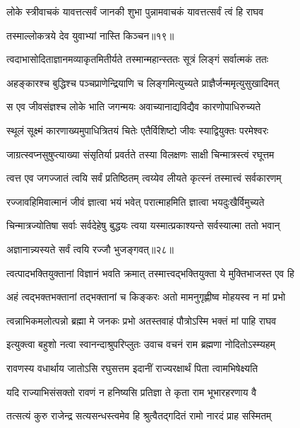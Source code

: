 \twolineshloka
{लोके स्त्रीवाचकं यावत्तत्सर्वं जानकी शुभा}
{पुन्नामवाचकं यावत्तत्सर्वं त्वं हि राघव} %

{तस्माल्लोकत्रये देव युवाभ्यां नास्ति किञ्चन॥१९॥} %


\twolineshloka
{त्वदाभासोदिताज्ञानमव्याकृतमितीर्यते}
{तस्मान्महान्स्ततः सूत्रं लिङ्गं सर्वात्मकं ततः} %

\twolineshloka
{अहङ्कारश्च बुद्धिश्च पञ्चप्राणेन्द्रियाणि च}
{लिङ्गमित्युच्यते प्राज्ञैर्जन्ममृत्युसुखादिमत्} %

\twolineshloka
{स एव जीवसंज्ञश्च लोके भाति जगन्मयः}
{अवाच्यानाद्यविद्यैव कारणोपाधिरुच्यते} %

\twolineshloka
{स्थूलं सूक्ष्मं कारणाख्यमुपाधित्रितयं चितेः}
{एतैर्विशिष्टो जीवः स्याद्वियुक्तः परमेश्वरः} %

\twolineshloka
{जाग्रत्स्वप्नसुषुप्त्याख्या संसृतिर्या प्रवर्तते}
{तस्या विलक्षणः साक्षी चिन्मात्रस्त्वं रघूत्तम} %

\twolineshloka
{त्वत्त एव जगज्जातं त्वयि सर्वं प्रतिष्ठितम्}
{त्वय्येव लीयते कृत्स्नं तस्मात्त्वं सर्वकारणम्} %

\twolineshloka
{रज्जावहिमिवात्मानं जीवं ज्ञात्वा भयं भवेत्}
{परात्माहमिति ज्ञात्वा भयदुःखैर्विमुच्यते} %

\twolineshloka
{चिन्मात्रज्योतिषा सर्वाः सर्वदेहेषु बुद्धयः}
{त्वया यस्मात्प्रकाश्यन्ते सर्वस्यात्मा ततो भवान्} %

{अज्ञानान्न्यस्यते सर्वं त्वयि रज्जौ भुजङ्गवत्॥२८॥} %


\twolineshloka
{त्वत्पादभक्तियुक्तानां विज्ञानं भवति क्रमात्}
{तस्मात्त्वद्भक्तियुक्ता ये मुक्तिभाजस्त एव हि} %

\twolineshloka
{अहं त्वद्भक्तभक्तानां तद्भक्तानां च किङ्करः}
{अतो मामनुगृह्णीष्व मोहयस्व न मां प्रभो} %

\twolineshloka
{त्वन्नाभिकमलोत्पन्नो ब्रह्मा मे जनकः प्रभो}
{अतस्तवाहं पौत्रोऽस्मि भक्तं मां पाहि राघव} %

\twolineshloka
{इत्युक्त्वा बहुशो नत्वा स्वानन्दाश्रुपरिप्लुतः}
{उवाच वचनं राम ब्रह्मणा नोदितोऽस्म्यहम्} %

\twolineshloka
{रावणस्य वधार्थाय जातोऽसि रघुसत्तम}
{इदानीं राज्यरक्षार्थं पिता त्वामभिषेक्ष्यति} %

\twolineshloka
{यदि राज्याभिसंसक्तो रावणं न हनिष्यसि}
{प्रतिज्ञा ते कृता राम भूभारहरणाय वै} %

\twolineshloka
{तत्सत्यं कुरु राजेन्द्र सत्यसन्धस्त्वमेव हि}
{श्रुत्वैतद्गदितं रामो नारदं प्राह सस्मितम्} %

